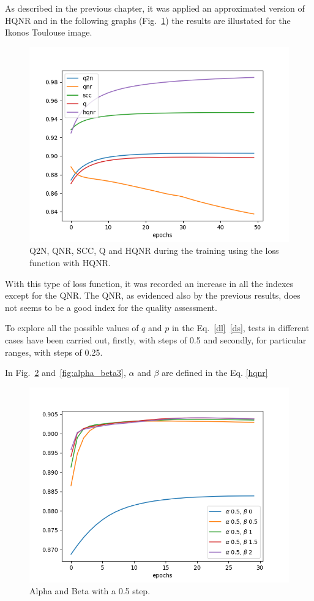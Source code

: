 \documentclass[12pt]{report}
\begin{document}
As described in the previous chapter, it was applied an approximated version of HQNR and in the following graphs (Fig.~\ref{fig:hqnr1})
the results are illustated for the Ikonos Toulouse image.


\begin{figure}[t]
    \centering
    \includegraphics[scale=.7]{toulouse_noref.png}
    \caption{Q2N, QNR, SCC, Q and HQNR during the training using the loss function with HQNR.}
    \label{fig:hqnr1}
\end{figure}

With this type of loss function, it was recorded an increase in all the indexes except for the QNR.
The QNR, as evidenced also by the previous results, does not seems to be a good index for the quality assessment.

To explore all the possible values of $q$ and $p$ in the Eq.~\ref{dl}~\ref{ds}, 
tests in different cases have been carried out, firstly, with steps of 0.5 and secondly, for particular ranges, with steps of 0.25.

In Fig.~\ref{fig:alpha_beta1} and~\ref{fig:alpha_beta3}, $\alpha$ and $\beta$ are defined in the Eq. \ref{hqnr}

\begin{figure}[t]
    \centering
    \includegraphics[scale=.7]{alpha_beta1.png}
    \caption{Alpha and Beta with a 0.5 step.}
    \label{fig:alpha_beta1}
\end{figure}
\end{document}
